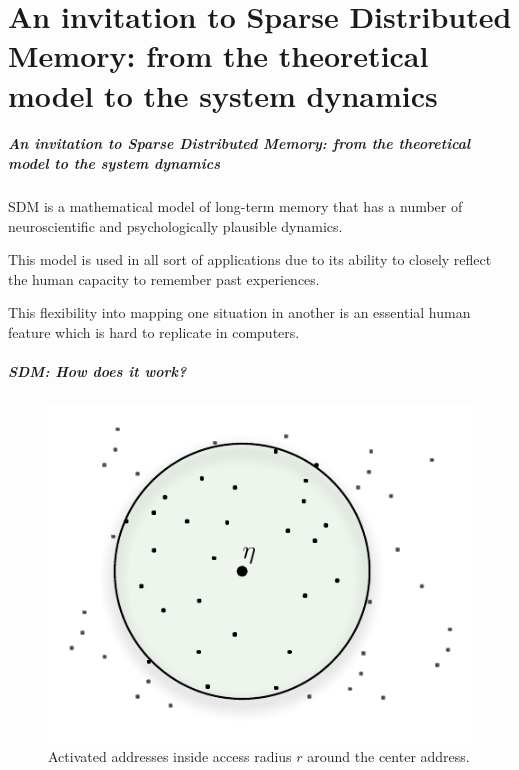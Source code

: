 \documentclass{beamer}
\begin{document}
\part{An invitation to Sparse Distributed Memory: from the theoretical model to the system dynamics}
\begin{frame}
\frametitle{An invitation to Sparse Distributed Memory: from the theoretical model to the system dynamics}

SDM is a mathematical model of long-term memory that has a number of neuroscientific and psychologically plausible dynamics.

This model is used in all sort of applications due to its ability to closely reflect the human capacity to remember past experiences.

This flexibility into mapping one situation in another is an essential human feature which is hard to replicate in computers.

\end{frame}


\begin{frame}
\frametitle{SDM: How does it work?}

\begin{figure}
\centering\includegraphics[scale=0.75]{./images02/p_circle_r.pdf}
\caption{Activated addresses inside access radius $r$ around the center address.}
\end{figure}

\end{frame}
\end{document}
